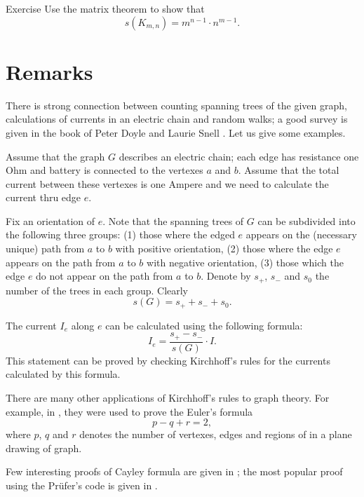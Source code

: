 \begin{thm}{Exercise}
Use the matrix theorem to show that 
\[s(K_{m,n})=m^{n-1}\cdot n^{m-1}.\]
\end{thm}



\section*{Remarks}

There is strong connection between counting spanning trees of the given graph,
calculations of currents in an electric chain 
and random walks; a good survey is given in the book of Peter Doyle and Laurie Snell \cite{doyle-snell}. Let us give some examples.

Assume that the graph $G$ describes an electric chain;
each edge has resistance one Ohm and battery is connected to the vertexes $a$ and $b$.
Assume that the total current between these vertexes is one Ampere and we need to calculate the current thru edge $e$.

Fix an orientation of $e$.
Note that the spanning trees of $G$ can be subdivided into the following three groups:
(1) those where the edged $e$ appears on the (necessary unique) path from $a$ to $b$ with positive orientation,
(2) those where the edge $e$ appears on the path from $a$ to $b$ with negative orientation,
(3) those which the edge $e$ do not appear on the path from $a$ to $b$.
Denote by $s_+$, $s_-$ and $s_0$ the number of the trees in each group.
Clearly 
\[s(G)=s_++s_-+s_0.\]

The current $I_e$ along $e$ can be calculated using the following formula:
\[I_e=\frac{s_+-s_-}{s(G)}\cdot I.\]
This statement can be proved by checking Kirchhoff's rules for the currents calculated by this formula.

There are many other applications of Kirchhoff's rules to graph theory.
For example, in \cite{levi}, they were used to prove the Euler's formula
\[p-q+r=2,\]
where $p$, $q$ and $r$ denotes the number of vertexes, edges and regions of in a plane drawing of graph.

Few interesting proofs of Cayley formula are given in \cite[Chapter 30]{aigner-ziegler};
the most popular proof using the Pr\"ufer's code is given in \cite{pearls}.



